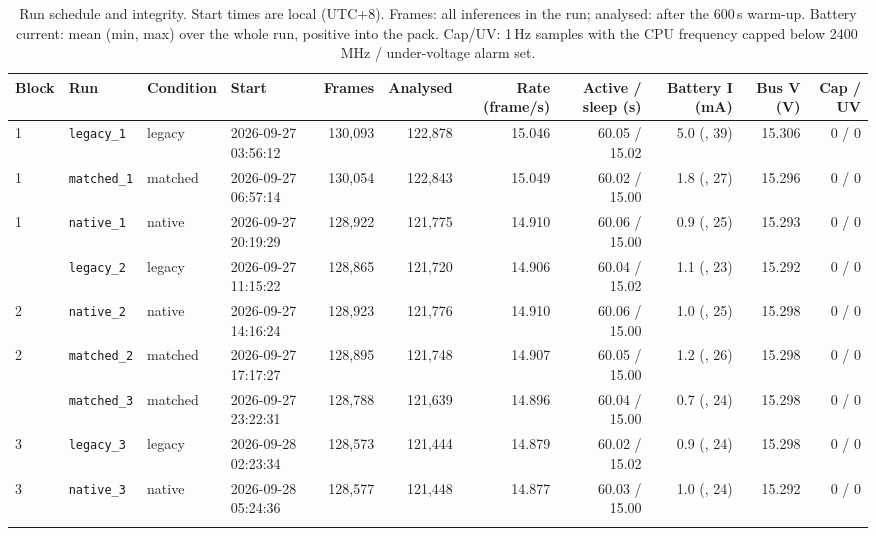 \begin{table}[!htbp]\centering\scriptsize
\caption{Run schedule and integrity. Start times are local (UTC+8). Frames: all inferences in the run; analysed: after the 600\,s warm-up. Battery current: mean (min, max) over the whole run, positive into the pack. Cap/UV: 1\,Hz samples with the CPU frequency capped below 2400\,MHz / under-voltage alarm set.}
\label{tab:s-runs}\setlength{\tabcolsep}{3.2pt}
\begin{tabular}{llllrrrrrrr}\toprule
Block & Run & Condition & Start & Frames & Analysed & Rate (frame/s) & Active / sleep (s) & Battery I (mA) & Bus V (V) & Cap / UV\\\midrule
1 & \texttt{legacy\_1} & legacy & 2026-09-27 03:56:12 & 130,093 & 122,878 & 15.046 & 60.05 / 15.02 & 5.0 (\textminus 12, 39) & 15.306 & 0 / 0\\
1 & \texttt{matched\_1} & matched & 2026-09-27 06:57:14 & 130,054 & 122,843 & 15.049 & 60.02 / 15.00 & 1.8 (\textminus 24, 27) & 15.296 & 0 / 0\\
1 & \texttt{native\_1} & native & 2026-09-27 20:19:29 & 128,922 & 121,775 & 14.910 & 60.06 / 15.00 & 0.9 (\textminus 27, 25) & 15.293 & 0 / 0\\
\addlinespace
2 & \texttt{legacy\_2} & legacy & 2026-09-27 11:15:22 & 128,865 & 121,720 & 14.906 & 60.04 / 15.02 & 1.1 (\textminus 21, 23) & 15.292 & 0 / 0\\
2 & \texttt{native\_2} & native & 2026-09-27 14:16:24 & 128,923 & 121,776 & 14.910 & 60.06 / 15.00 & 1.0 (\textminus 18, 25) & 15.298 & 0 / 0\\
2 & \texttt{matched\_2} & matched & 2026-09-27 17:17:27 & 128,895 & 121,748 & 14.907 & 60.05 / 15.00 & 1.2 (\textminus 17, 26) & 15.298 & 0 / 0\\
\addlinespace
3 & \texttt{matched\_3} & matched & 2026-09-27 23:22:31 & 128,788 & 121,639 & 14.896 & 60.04 / 15.00 & 0.7 (\textminus 27, 24) & 15.298 & 0 / 0\\
3 & \texttt{legacy\_3} & legacy & 2026-09-28 02:23:34 & 128,573 & 121,444 & 14.879 & 60.02 / 15.02 & 0.9 (\textminus 21, 24) & 15.298 & 0 / 0\\
3 & \texttt{native\_3} & native & 2026-09-28 05:24:36 & 128,577 & 121,448 & 14.877 & 60.03 / 15.00 & 1.0 (\textminus 20, 24) & 15.292 & 0 / 0\\
\addlinespace
\bottomrule\end{tabular}\end{table}
